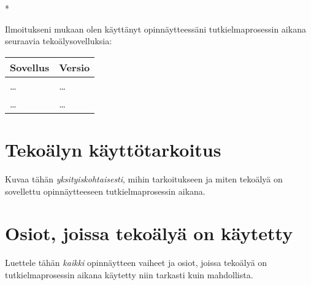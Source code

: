 \begin{aidisclaimer} * %

Ilmoitukseni mukaan olen käyttänyt opinnäytteessäni tutkielmaprosessin aikana
seuraavia tekoälysovelluksia:

\begin{center}
    \begin{tabularx}{\linewidth}{X|l}
        \toprule
        \textbf{Sovellus} & \textbf{Versio} \\
        \midrule
        \dots & \dots \\
        \dots & \dots \\
        \bottomrule
    \end{tabularx}
\end{center}

\section*{Tekoälyn käyttötarkoitus}

Kuvaa tähän \emph{yksityiskohtaisesti}, mihin tarkoitukseen ja miten tekoälyä
on sovellettu opinnäytteeseen tutkielmaprosessin aikana.

\section*{Osiot, joissa tekoälyä on käytetty}

Luettele tähän \emph{kaikki} opinnäytteen vaiheet ja osiot, joissa tekoälyä on
tutkielmaprosessin aikana käytetty niin tarkasti kuin mahdollista.

\end{aidisclaimer}
